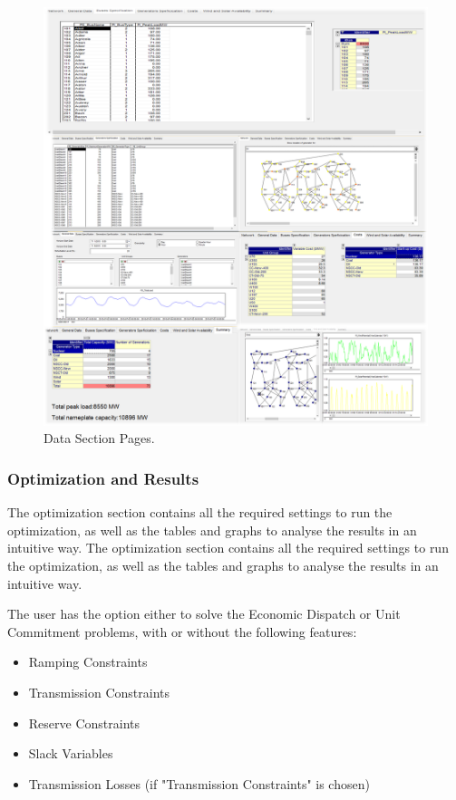 \documentclass[12pt,LUDisStyle,twosided]{book}
\begin{document}
\newpage
\begin{figure}[H] 
	\begin{center}
		\includegraphics[width=\textwidth,height=\textheight,keepaspectratio]{aimmsDataPages.png}
	  	\caption{Data Section Pages.}
     	\label{fig:dataSectionPages}
	\end{center}
\end{figure}


\subsubsection{Optimization and Results}

The optimization section contains all the required settings to run the optimization, as well as the tables and graphs to analyse the results in an intuitive way. 
The optimization section contains all the required settings to run the optimization, as well as the tables and graphs to analyse the results in an intuitive way. 

The user has the option either to solve the Economic Dispatch or Unit Commitment problems, with or without the following features:

\begin{itemize}
\item Ramping Constraints
\item Transmission Constraints
\item Reserve Constraints
\item Slack Variables
\item Transmission Losses (if "Transmission Constraints" is chosen)
\end{itemize}
\end{document}
